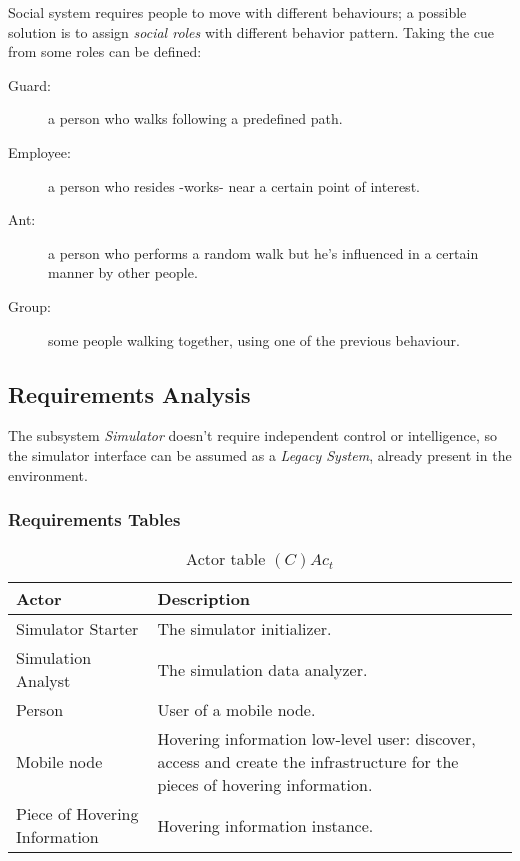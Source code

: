 Social system requires people to move with different behaviours; a possible
solution is to assign \emph{social roles} with different behavior pattern.
Taking the cue from \cite{human} some roles can be defined:

\begin{description}
	\item[Guard:] a person who walks following a predefined path.
	\item[Employee:] a person who resides -works- near a certain point of interest.
	\item[Ant:] a person who performs a random walk but he's influenced in a
		certain manner by other people.
	\item[Group:] some people walking together, using one of the previous
		behaviour.
\end{description}

\subsection{Requirements Analysis}

The subsystem \emph{Simulator} doesn't require independent control or
intelligence, so the simulator interface can be assumed as a \emph{Legacy
System}, already present in the environment.

\subsubsection{Requirements Tables}

\begin{table}[H]
	\centering
	\begin{tabular}{|p{4cm}|p{8cm}|}
			\hline
			\textbf{Actor} & \textbf{Description} \\
			\hline
			Simulator Starter & The simulator initializer. \\
			\hline
			Simulation Analyst & The simulation data analyzer. \\
			\hline
			Person & User of a mobile node. \\
			\hline
			Mobile node & Hovering information low-level user: discover, access and
			create the infrastructure for the pieces of hovering information. \\
			\hline
			Piece of Hovering Information & Hovering information instance. \\
			\hline
		\end{tabular}
	\caption{Actor table $(C)Ac_t$}
	\label{tab:cact}
\end{table}

